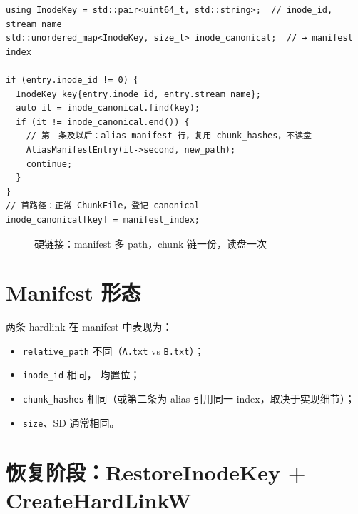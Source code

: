 \begin{lstlisting}[caption={Hardlink dedup 概念 (backup\_engine.cc)}]
using InodeKey = std::pair<uint64_t, std::string>;  // inode_id, stream_name
std::unordered_map<InodeKey, size_t> inode_canonical;  // → manifest index

if (entry.inode_id != 0) {
  InodeKey key{entry.inode_id, entry.stream_name};
  auto it = inode_canonical.find(key);
  if (it != inode_canonical.end()) {
    // 第二条及以后：alias manifest 行，复用 chunk_hashes，不读盘
    AliasManifestEntry(it->second, new_path);
    continue;
  }
}
// 首路径：正常 ChunkFile，登记 canonical
inode_canonical[key] = manifest_index;
\end{lstlisting}

\begin{figure}[htbp]
\centering
{}
\caption{硬链接：manifest 多 path，chunk 链一份，读盘一次}
\end{figure}

\section{Manifest 形态}

两条 hardlink 在 manifest 中表现为：

\begin{itemize}[nosep]
  \item \texttt{relative\_path} 不同（\texttt{A.txt} vs \texttt{B.txt}）；
  \item \texttt{inode\_id} 相同， 均置位；
  \item \texttt{chunk\_hashes} 相同（或第二条为 alias 引用同一 index，取决于实现细节）；
  \item \texttt{size}、SD 通常相同。
\end{itemize}

\section{恢复阶段：RestoreInodeKey + CreateHardLinkW}

